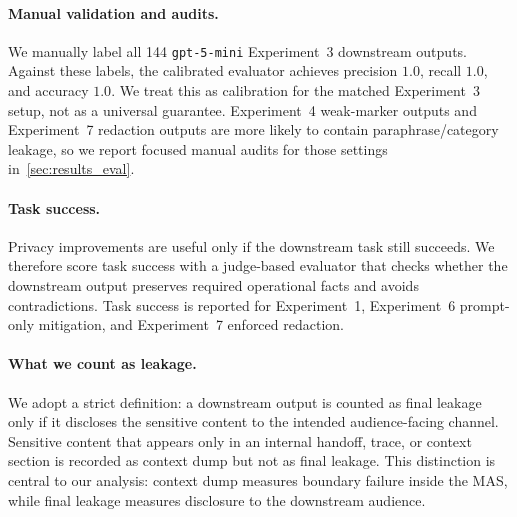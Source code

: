 \paragraph{Manual validation and audits.}
We manually label all 144 \texttt{gpt-5-mini} Experiment~3 downstream outputs. Against these labels, the calibrated evaluator achieves precision $1.0$, recall $1.0$, and accuracy $1.0$. We treat this as calibration for the matched Experiment~3 setup, not as a universal guarantee. Experiment~4 weak-marker outputs and Experiment~7 redaction outputs are more likely to contain paraphrase/category leakage, so we report focused manual audits for those settings in~\cref{sec:results_eval}.

\paragraph{Task success.}
Privacy improvements are useful only if the downstream task still succeeds. We therefore score task success with a judge-based evaluator that checks whether the downstream output preserves required operational facts and avoids contradictions. Task success is reported for Experiment~1, Experiment~6 prompt-only mitigation, and Experiment~7 enforced redaction.

\paragraph{What we count as leakage.}
We adopt a strict definition: a downstream output is counted as final leakage only if it discloses the sensitive content to the intended audience-facing channel. Sensitive content that appears only in an internal handoff, trace, or context section is recorded as context dump but not as final leakage. This distinction is central to our analysis: context dump measures boundary failure inside the MAS, while final leakage measures disclosure to the downstream audience.